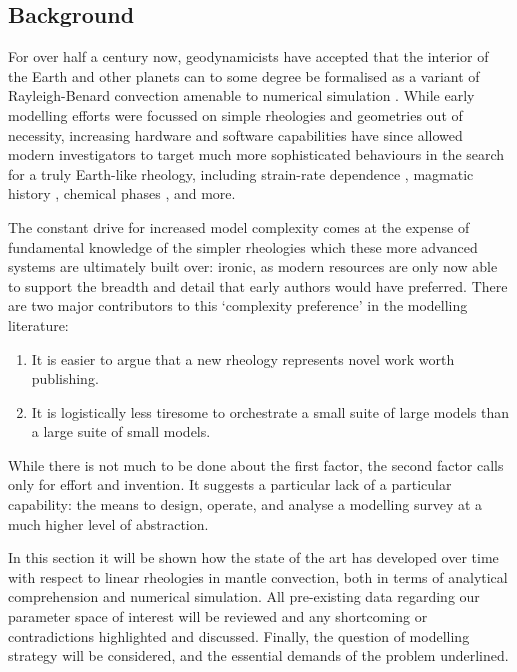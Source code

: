 \documentclass[a4paper,11pt,oneside]{book}
\begin{document}
\subsection{Background}

For over half a century now, geodynamicists have accepted that the interior of the Earth and other planets can to some degree be formalised as a variant of Rayleigh-Benard convection amenable to numerical simulation \cite{McKenzie1974-wb}. While early modelling efforts were focussed on simple rheologies and geometries out of necessity, increasing hardware and software capabilities have since allowed modern investigators to target much more sophisticated behaviours in the search for a truly Earth-like rheology, including strain-rate dependence \citet{Moresi1998-az, Zhong1998-qg}, magmatic history \cite{ONeill2018-hy}, chemical phases \cite{Tackley2012-hq}, and more.

The constant drive for increased model complexity comes at the expense of fundamental knowledge of the simpler rheologies which these more advanced systems are ultimately built over: ironic, as modern resources are only now able to support the breadth and detail that early authors would have preferred. There are two major contributors to this `complexity preference' in the modelling literature:

\begin{enumerate}
\item It is easier to argue that a new rheology represents novel work worth publishing.
\item It is logistically less tiresome to orchestrate a small suite of large models than a large suite of small models.
\end{enumerate}

While there is not much to be done about the first factor, the second factor calls only for effort and invention. It suggests a particular lack of a particular capability: the means to design, operate, and analyse a modelling survey at a much higher level of abstraction.

In this section it will be shown how the state of the art has developed over time with respect to linear rheologies in mantle convection, both in terms of analytical comprehension and numerical simulation. All pre-existing data regarding our parameter space of interest will be reviewed and any shortcoming or contradictions highlighted and discussed. Finally, the question of modelling strategy will be considered, and the essential demands of the problem underlined.
\end{document}
